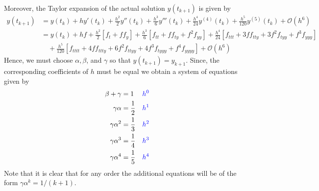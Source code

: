 \documentclass[11.5pt]{article}
\newcommand\BLK{\color{black}}
\newcommand\BLU{\color{blue}}
\begin{document}
Moreover, the Taylor expansion of the actual solution $y(t_{k+1})$ is given by
\begin{align*}
y(t_{k+1}) &= y(t_k) + hy'(t_k) + \frac{h^2}{2}y''(t_k) + \frac{h^3}{6}y'''(t_k) + \frac{h^4}{24}y^{(4)}(t_k) + \frac{h^5}{120}y^{(5)}(t_k) + \mathcal{O}(h^6)\\
&= y(t_k) + hf + \frac{h^2}{2}\left[f_t + ff_y \right] + \frac{h^3}{6}\left[f_{tt} + ff_{ty} + f^2f_{yy} \right] + \frac{h^4}{24}\left[ f_{ttt} + 3ff_{tty} + 3f^2f_{tyy} + f^3f_{yyy}\right]\\ &\quad + \frac{h^5}{120}\left[f_{tttt} + 4ff_{ttty} + 6f^2f_{ttyy} + 4f^3f_{tyyy}+f^4f_{yyyy} \right] + \mathcal{O}(h^6)
\end{align*}
Hence, we must choose $\alpha,\beta$, and $\gamma$ so that $y(t_{k+1}) = y_{k+1}$. Since, the corresponding coefficients of $h$ must be equal we obtain a system of equations given by
\begin{align*}
\beta + \gamma &= 1 & \BLU h^0 \BLK\\
\gamma\alpha &= \frac{1}{2} & \BLU h^1 \BLK\\
\gamma\alpha^2 &= \frac{1}{3} & \BLU h^2 \BLK\\
\gamma \alpha^3  &= \frac{1}{4} & \BLU h^3 \BLK\\
\gamma \alpha^4 &= \frac{1}{5} & \BLU h^4 \BLK\\
\end{align*}
Note that it is clear that for any order the additional equations will be of the form $\gamma \alpha^k = 1/(k+1)$.  
\end{document}
